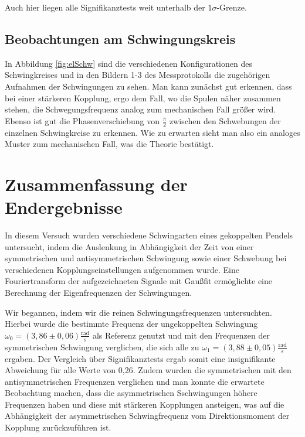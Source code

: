 \documentclass{article}
\begin{document}
\phantom{.}

Auch hier liegen alle Signifikanztests weit unterhalb der $1\sigma$-Grenze.

\subsection{Beobachtungen am Schwingungskreis}

In Abbildung \ref{fig:elSchw} sind die verschiedenen Konfigurationen des Schwingkreises und in den Bildern 1-3 des Messprotokolls die zugehörigen Aufnahmen der Schwingungen zu sehen. Man kann zunächst gut erkennen, dass bei einer stärkeren Kopplung, ergo dem Fall, wo die Spulen näher zusammen stehen, die Schwegungsfrequenz analog zum mechanischen Fall größer wird. Ebenso ist gut die Phasenverschiebung von $\frac{\pi}{2}$ zwischen den Schwebungen der einzelnen Schwingkreise zu erkennen. Wie zu erwarten sieht man also ein analoges Muster zum mechanischen Fall, was die Theorie bestätigt. 

\newpage
\section{Zusammenfassung der Endergebnisse}

In diesem Versuch wurden verschiedene Schwingarten eines gekoppelten Pendels untersucht, indem die Auslenkung in Abhängigkeit der Zeit von einer symmetrischen und antisymmetrischen Schwingung sowie einer Schwebung bei verschiedenen Kopplungseinstellungen aufgenommen wurde. Eine Fouriertransform der aufgezeichneten Signale mit Gaußfit ermöglichte eine Berechnung der Eigenfrequenzen der Schwingungen. 

Wir begannen, indem wir die reinen Schwingungsfrequenzen untersuchten. Hierbei wurde die bestimmte Frequenz der ungekoppelten Schwingung $\omega_0 = (3,86 \pm 0,06) \frac{\text{rad}}{\text{s}}$ als Referenz genutzt und mit den Frequenzen der symmetrischen Schwingung verglichen, die sich alle zu $\omega_1 = (3,88 \pm 0,05) \frac{\text{rad}}{\text{s}}$ ergaben. Der Vergleich über Signifikanztests ergab somit eine insignifikante Abweichung für alle Werte von 0,26. Zudem wurden die symmetrischen mit den antisymmetrischen Frequenzen verglichen und man konnte die erwartete Beobachtung machen, dass die asymmetrischen Sschwingungen höhere Frequenzen haben und diese mit stärkeren Kopplungen ansteigen, was auf die Abhängigkeit der asymmetrischen Schwingfrequenz vom Direktionsmoment der Kopplung zurückzuführen ist. 
\end{document}
